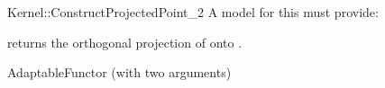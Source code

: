 \begin{ccRefFunctionObjectConcept}{Kernel::ConstructProjectedPoint_2}
A model for this must provide:


       {returns the orthogonal projection of  onto .}

\ccRefines
AdaptableFunctor (with two arguments)

\ccSeeAlso
{} \\

\end{ccRefFunctionObjectConcept}
